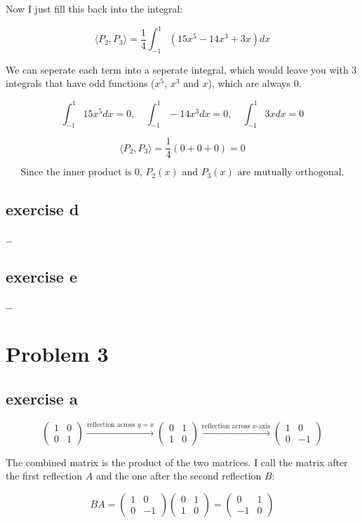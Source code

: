 \documentclass[11pt, a4paper]{article}
\begin{document}
Now I just fill this back into the integral:

\[
\langle P_2, P_3 \rangle = \frac{1}{4} \int_{-1}^{1} (15x^5 - 14x^3 + 3x) dx
\]

We can seperate each term into a seperate integral, which would leave you with 3 integrals that have odd functions ($x^5$, $x^3$ and $x$), which are always 0.

\[
\int_{-1}^{1} 15x^5 dx = 0, \quad \int_{-1}^{1} -14x^3 dx = 0, \quad \int_{-1}^{1} 3x dx = 0
\]

\[
\langle P_2, P_3 \rangle = \frac{1}{4} (0 + 0 + 0) = 0
\]

\[
\boxed{\text{Since the inner product is 0, $P_2(x)$ and $P_3(x)$ are mutually orthogonal.}}
\]

\subsection*{exercise d}
\ldots

\subsection*{exercise e}
\ldots




\pagebreak
\section*{Problem 3}

\subsection*{exercise a}

\[
\begin{pmatrix}
	1 & 0 \\
	0 & 1
\end{pmatrix} \xrightarrow{\text{reflection across $y=x$}}
\begin{pmatrix}
	0 & 1 \\
	1 & 0
\end{pmatrix} \xrightarrow{\text{reflection across $x$-axis}}
\begin{pmatrix}
	1 & 0 \\
	0 & -1
\end{pmatrix}
\]

The combined matrix is the product of the two matrices. I call the matrix after the first reflection $A$ and the one after the second reflection $B$:

\[
BA = \begin{pmatrix}
	1 & 0 \\
	0 & -1
\end{pmatrix} \begin{pmatrix}
	0 & 1 \\
	1 & 0
\end{pmatrix} = \begin{pmatrix}
	0 & 1 \\
	-1 & 0
\end{pmatrix}
\]
\end{document}
